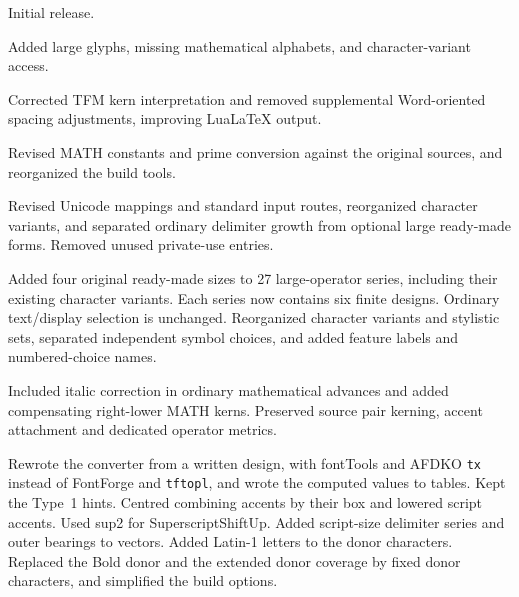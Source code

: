 \documentclass[10pt]{article}
\newcommand\code[1]{\texttt{#1}}
\begin{document}
\begin{description}[font=\normalfont,leftmargin=3.3em,labelwidth=2.8em,labelsep=.5em]
\item[v1.0] Initial release.
\item[v1.1] Added large glyphs, missing mathematical alphabets, and
  character-variant access.
\item[v1.2] Corrected TFM kern interpretation and removed supplemental
  Word-oriented spacing adjustments, improving LuaLaTeX output.
\item[v1.3] Revised MATH constants and prime conversion against the
  original sources, and reorganized the build tools.
\item[v1.4] Revised Unicode mappings and standard input routes,
  reorganized character variants, and separated ordinary delimiter
  growth from optional large ready-made forms. Removed unused
  private-use entries.
\item[v1.5] Added four original ready-made sizes to 27 large-operator
  series, including their existing character variants. Each series now
  contains six finite designs. Ordinary text/display selection is
  unchanged. Reorganized character variants and stylistic sets,
  separated independent symbol choices, and added feature labels and
  numbered-choice names.
\item[v1.6] Included italic correction in ordinary mathematical advances
  and added compensating right-lower MATH kerns. Preserved source pair
  kerning, accent attachment and dedicated operator metrics.
\item[v1.7] Rewrote the converter from a written design, with fontTools
  and AFDKO \code{tx} instead of FontForge and \code{tftopl}, and wrote
  the computed values to tables. Kept the Type~1 hints. Centred
  combining accents by their box and lowered script accents. Used sup2
  for SuperscriptShiftUp. Added script-size delimiter series and outer
  bearings to vectors. Added Latin-1 letters to the donor characters.
  Replaced the Bold donor and the extended donor coverage by fixed
  donor characters, and simplified the build options.
\end{description}
\end{document}
